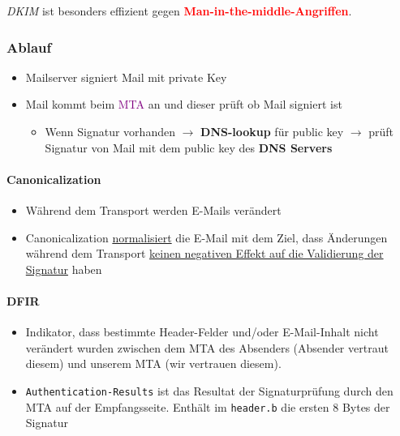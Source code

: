 \textit{DKIM} ist besonders effizient gegen \textcolor{red}{\textbf{Man-in-the-middle-Angriffen}}.

\subsubsection{Ablauf}
\begin{itemize}
    \item Mailserver signiert Mail mit private Key
    \item Mail kommt beim  \textcolor{purple}{MTA} an und dieser prüft ob Mail signiert ist
    \begin{itemize}
        \item Wenn Signatur vorhanden $\rightarrow$ \textbf{DNS-lookup} für public key $\rightarrow$ prüft Signatur von Mail mit dem public key des \textbf{DNS Servers}\\
    \end{itemize}
\end{itemize}

\paragraph{Canonicalization}
\begin{itemize}
    \item Während dem Transport werden E-Mails verändert
    \item Canonicalization \underline{normalisiert} die E-Mail mit dem Ziel, dass Änderungen während dem Transport \underline{keinen negativen Effekt auf die Validierung der Signatur} haben
\end{itemize}

\paragraph{DFIR}
\begin{itemize}
    \item Indikator, dass bestimmte Header-Felder und/oder E-Mail-Inhalt nicht verändert wurden zwischen dem MTA des Absenders (Absender vertraut diesem) und unserem MTA (wir vertrauen diesem).
    \item \lstinline|Authentication-Results| ist das Resultat der Signaturprüfung durch den MTA auf der Empfangsseite. Enthält im \lstinline|header.b| die ersten 8 Bytes der Signatur
\end{itemize}

